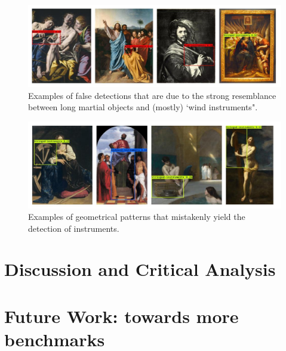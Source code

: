 \begin{figure}[ht!]
\centering
  \includegraphics[width=\linewidth]{./Images/Chapter05/false_positives_2}
  \caption{Examples of false detections that are due to the strong resemblance between long martial objects and (mostly) `wind instruments".}
  \label{fig:false_positives_2}
\end{figure}


\begin{figure}[ht!]
\centering
  \includegraphics[width=\linewidth]{./Images/Chapter05/false_positives_3}
  \caption{Examples of geometrical patterns that mistakenly yield the detection of instruments.}
  \label{fig:false_positives_3}
\end{figure}



\section{Discussion and Critical Analysis}
\label{sec:discussion}






\section{Future Work: towards more benchmarks}
\label{sec:future_work}
